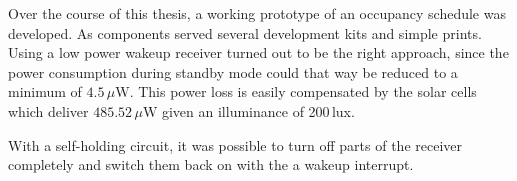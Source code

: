 Over the course of this thesis, a working prototype of an occupancy schedule was developed.
As components served several development kits and simple prints.
Using a low power wakeup receiver turned out to be the right approach, since the power consumption during standby mode could that way be reduced to a minimum of $4.5\,\mu\text{W}$.
This power loss is easily compensated by the solar cells which deliver $485.52\,\mu\text{W}$ given an illuminance of 200\,lux.

With a self-holding circuit, it was possible to turn off parts of the receiver completely and switch them back on with the a wakeup interrupt.
